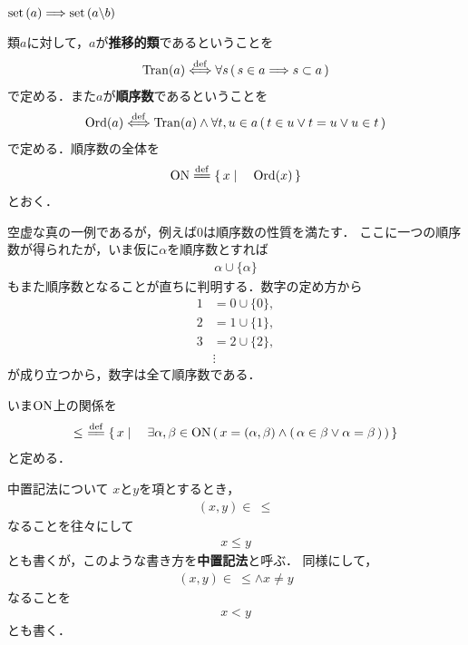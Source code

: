 	$\operatorname*{set} \left(a\right) \Longrightarrow \operatorname*{set} \left(a \backslash b\right)$
	
	\begin{screen}
		\begin{dfn}[順序数]
			類$a$に対して，$a$が{\bf 推移的類}であるということを
			\begin{align}
				\operatorname{Tran}(a) \overset{\mathrm{def}}{\Longleftrightarrow}
				\forall s\, (\, s \in a \Longrightarrow s \subset a\, )
			\end{align}
			で定める．また$a$が{\bf 順序数}であるということを
			\begin{align}
				\operatorname{Ord}(a) \overset{\mathrm{def}}{\Longleftrightarrow}
				\operatorname{Tran}(a)
				\wedge \forall t,u \in a\, (\, t \in u \vee t = u \vee u \in t\, )
			\end{align}
			で定める．順序数の全体を
			\begin{align}
				\ON \defeq \Set{x}{\operatorname{Ord}(x)}
			\end{align}
			とおく．
		\end{dfn}
	\end{screen}
	
	空虚な真の一例であるが，例えば$0$は順序数の性質を満たす．
	ここに一つの順序数が得られたが，いま仮に$\alpha$を順序数とすれば
	\begin{align}
		\alpha \cup \{\alpha\}
	\end{align}
	もまた順序数となることが直ちに判明する．数字の定め方から
	\begin{align}
		1 &= 0 \cup \{0\}, \\
		2 &= 1 \cup \{1\}, \\
		3 &= 2 \cup \{2\}, \\
		&\vdots
	\end{align}
	が成り立つから，数字は全て順序数である．
	
	いま$\mathrm{ON}$上の関係を
	\begin{align}
		\leq\ \defeq \Set{x}{\exists \alpha,\beta \in \ON\, 
		(\, x=(\alpha,\beta) \wedge (\, \alpha \in \beta \vee \alpha = \beta\, )\, )}
	\end{align}
	と定める．
		
	\begin{itembox}[l]{中置記法について}
		$x$と$y$を項とするとき，
		\begin{align}
			(x,y) \in\ \leq
		\end{align}
		なることを往々にして
		\begin{align}
			x \leq y
		\end{align}
		とも書くが，このような書き方を{\bf 中置記法}と呼ぶ．
		同様にして，
		\begin{align}
			(x,y) \in\ \leq \wedge x \neq y
		\end{align}
		なることを
		\begin{align}
			x < y
		\end{align}
		とも書く．
	\end{itembox}
	
